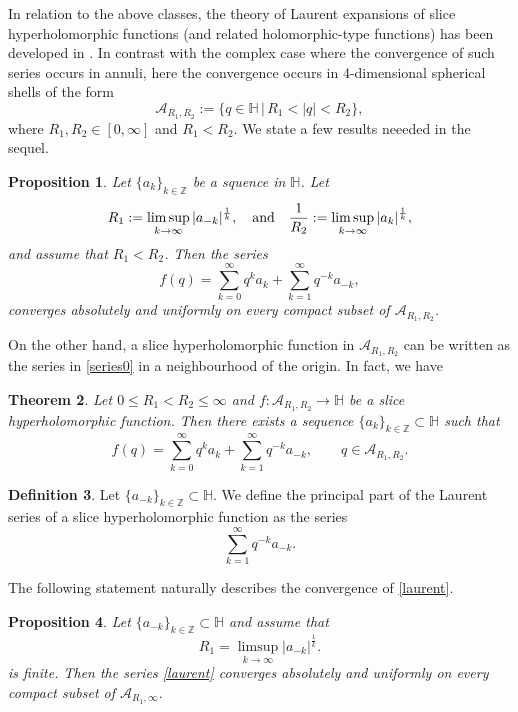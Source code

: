 \documentclass[reqno,11pt]{amsart}
\newtheorem{theorem}{Theorem}[section]
\newtheorem{proposition}[theorem]{Proposition}
\theoremstyle{definition}
\newtheorem{definition}[theorem]{Definition}
\begin{document}
In relation to the above classes, the theory of Laurent expansions of slice hyperholomorphic functions (and related holomorphic-type functions) has been developed in \cite{CDSm, ColomboSabadiniStruppa2011}. In contrast with the complex case where the convergence of such series occurs in annuli, here the convergence occurs in 4-dimensional spherical shells of the form
\[
\mathcal{A}_{R_1,R_2}:= \{ q \in \mathbb{H} \, | \, R_1<|q|<R_2\},
\]
where $R_1,R_2 \in [0, \infty]$ and $R_1<R_2$. We state a few results neeeded in the sequel.
\begin{proposition}
	Let $ \{a_k\}_{k \in \mathbb{Z}}$ be a squence in $ \mathbb{H}$. Let
	\[
	R_1:= \limsup_{k \to \infty}|a_{-k}|^{\frac{1}{k}}, \quad \hbox{and} \quad \frac{1}{R_2}:= \limsup_{k \to \infty}|a_k|^{\frac{1}{k}},
	\]
	and  assume that $R_1<R_2$. Then the series
	\begin{equation}
		\label{series0}
		f(q)= \sum_{k=0}^{\infty} q^k a_k+\sum_{k=1}^{\infty}q^{-k}a_{-k},
	\end{equation}
	converges absolutely and uniformly on every compact subset of $\mathcal{A}_{R_1,R_2}$.
\end{proposition}

On the other hand, a slice hyperholomorphic function in $\mathcal{A}_{R_1,R_2}$ can be written as the series in \eqref{series0} in a neighbourhood of the origin. In fact, we have
\begin{theorem}
	Let $0\leq R_1<R_2\leq \infty$ and $f: \mathcal{A}_{R_1,R_2} \to \mathbb{H}$ be a slice hyperholomorphic function. Then there exists a sequence $ \{a_k\}_{k \in \mathbb{Z}} \subset \mathbb{H}$ such that
	\[
	f(q)= \sum_{k=0}^{\infty}q^k a_k+\sum_{k=1}^{\infty} q^{-k} a_{-k}, \qquad q \in \mathcal{A}_{R_1,R_2}.
	\]
\end{theorem}


\begin{definition}
	Let $\{a_{-k}\}_{k \in \mathbb{Z}} \subset \mathbb{H}$. We define the principal part of the Laurent series of a slice hyperholomorphic function as the series
	\begin{equation}
		\label{laurent}
		\sum_{k=1}^{\infty}q^{-k}a_{-k}.
	\end{equation}
\end{definition}

The following statement naturally describes the convergence of  \eqref{laurent}.

\begin{proposition}
	\label{conve}
	Let $ \{a_{-k}\}_{k \in \mathbb{Z}} \subset \mathbb{H}$ and assume that
	\[
	R_1= \limsup_{k \to \infty}|a_{-k}|^{\frac{1}{k}}.
	\]
	is finite. Then the series \eqref{laurent} converges absolutely and uniformly on every compact subset of $\mathcal{A}_{R_1,\infty}$.
\end{proposition}
\end{document}
